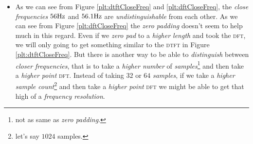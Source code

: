 \documentclass[../../course]{subfiles}
\begin{document}
\begin{itemize} [label=]
\begin{itemize} [label=]
            \item
                As we can see from Figure \ref{plt:dtftCloseFreq} and \ref{plt:dftCloseFreq}, the
                \emph{close frequencies} $\freqXTwo \si{Hz}$ and $\freqXThree \si{Hz}$ are
                \emph{undistinguishable} from each other. As we can see from Figure \ref{plt:dftCloseFreq}
                the \emph{zero padding} doesn't seem to help much in this regard. Even if we
                \emph{zero pad} to a \emph{higher length} and took the \textsc{dft}, we will only
                going to get something similar to the \textsc{dtft} in Figure \ref{plt:dtftCloseFreq}.
                But there is another way to be able to \emph{distinguish} between \emph{closer
                frequencies}, that is to take a \emph{higher number} of \emph{samples}\footnote{not
                as same as \emph{zero padding}.} and then take a \emph{higher point} \textsc{dft}.
                Instead of taking $32$ or $64$ \emph{samples}, if we take a \emph{higher sample
                count}\footnote{let's say $1024$ samples.} and then take a \emph{higher point}
                \textsc{dft} we might be able to get that high of a \emph{frequency resolution}.

        \end{itemize}

\end{itemize}
\end{document}
